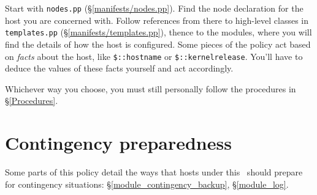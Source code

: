 Start with {\tt nodes.pp} (\S\ref{manifests/nodes.pp}). Find the node
declaration for the host you are concerned with. Follow references from
there to high-level classes in {\tt templates.pp}
(\S\ref{manifests/templates.pp}), thence to the modules, where you will
find the details of how the host is configured. Some pieces of the policy
act based on \emph{facts} about the host, like \verb!$::hostname! or
\verb!$::kernelrelease!. You'll have to deduce the values of these facts
yourself and act accordingly.

Whichever way you choose, you must still personally follow the procedures
in \S\ref{Procedures}.

\section{ Contingency preparedness }

Some parts of this policy detail the ways that hosts under this
\CMITSPolicy\ should prepare for contingency situations:
\S\ref{module_contingency_backup}, \S\ref{module_log}.
